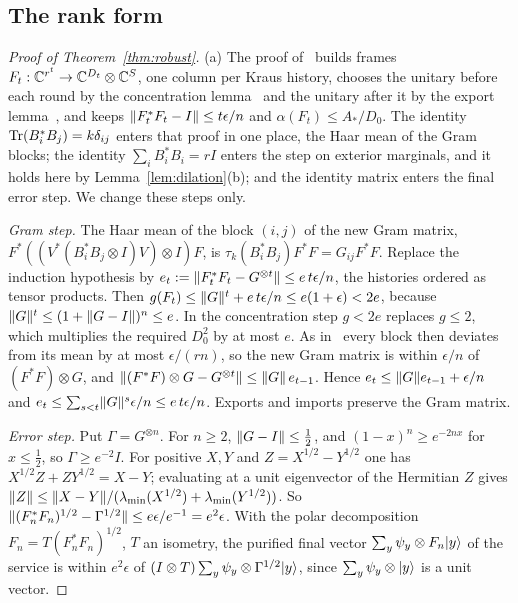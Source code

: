 \subsection{The rank form}

\begin{proof}[Proof of Theorem~\ref{thm:robust}]
(a) The proof of~\cite[Theorem~12.2]{DouglasMghirbiC} builds frames $F_t:\mathbb C^{r^t}\to\mathbb C^{D_t}\otimes\mathbb C^S$, one column per Kraus history, chooses the unitary
before each round by the concentration lemma~\cite[Lemma~A.1]{DouglasMghirbiB} and the unitary after it by the export lemma~\cite[Lemma~A.4]{DouglasMghirbiB},
and keeps $\lVert F_t^*F_t-I\rVert\le t\epsilon/n$ and $\alpha(F_t)\le A_*/D_0$. The identity $\operatorname{Tr}(B_i^*B_j)=k\delta_{ij}$ enters that proof in one place, the Haar mean
of the Gram blocks; the identity $\sum_iB_i^*B_i=rI$ enters the step on exterior marginals, and it holds here by Lemma~\ref{lem:dilation}(b); and the
identity matrix enters the final error step. We change these steps only.

\emph{Gram step.} The Haar mean of the block $(i,j)$ of the new Gram matrix, $F^*((V^*(B_i^*B_j\otimes I)V)\otimes I)F$, is $\tau_k(B_i^*B_j)F^*F=G_{ij}F^*F$.
Replace the induction hypothesis by $e_t:=\lVert F_t^*F_t-G^{\otimes t}\rVert\le e\,t\epsilon/n$, the histories ordered as tensor products. Then
$g(F_t)\le\lVert G\rVert^t+e\,t\epsilon/n\le e(1+\epsilon)<2e$, because $\lVert G\rVert^t\le(1+\lVert G-I\rVert)^n\le e$. In the concentration step $g<2e$ replaces $g\le2$, which
multiplies the required $D_0^2$ by at most $e$. As in~\cite{DouglasMghirbiC} every block then deviates from its mean by at most $\epsilon/(rn)$, so the new
Gram matrix is within $\epsilon/n$ of $(F^*F)\otimes G$, and $\lVert (F^*F)\otimes G-G^{\otimes t}\rVert\le\lVert G\rVert\,e_{t-1}$. Hence $e_t\le\lVert G\rVert e_{t-1}+\epsilon/n$ and
$e_t\le\sum_{s<t}\lVert G\rVert^s\epsilon/n\le e\,t\epsilon/n$. Exports and imports preserve the Gram matrix.

\emph{Error step.} Put $\Gamma=G^{\otimes n}$. For $n\ge2$, $\lVert G-I\rVert\le\frac12$, and $(1-x)^n\ge e^{-2nx}$ for $x\le\frac12$, so $\Gamma\ge e^{-2}I$. For
positive $X,Y$ and $Z=X^{1/2}-Y^{1/2}$ one has $X^{1/2}Z+ZY^{1/2}=X-Y$; evaluating at a unit eigenvector of the Hermitian $Z$ gives
$\lVert Z\rVert\le\lVert X-Y\rVert/(\lambda_{\min}(X^{1/2})+\lambda_{\min}(Y^{1/2}))$. So $\lVert (F_n^*F_n)^{1/2}-\Gamma^{1/2}\rVert\le e\epsilon/e^{-1}=e^2\epsilon$. With the polar
decomposition $F_n=T(F_n^*F_n)^{1/2}$, $T$ an isometry, the purified final vector $\sum_y\psi_y\otimes F_n\lvert y\rangle$ of the service is within $e^2\epsilon$ of
$(I\otimes T)\sum_y\psi_y\otimes\Gamma^{1/2}\lvert y\rangle$, since $\sum_y\psi_y\otimes\lvert y\rangle$ is a unit vector.


\end{proof}
